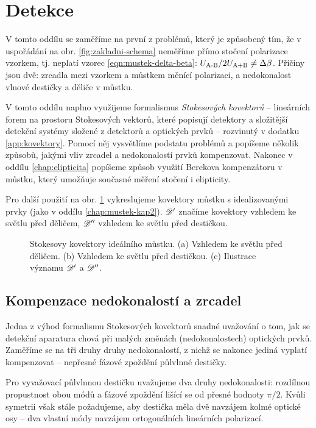 \section{Detekce}
\label{chap:detekce}

V tomto oddílu se zaměříme na první z problémů, který je způsobený tím, že v uspořádání na obr. \ref{fig:zakladni-schema} neměříme přímo stočení polarizace vzorkem, tj. neplatí vzorec \eqref{eqn:mustek-delta-beta}: $U_\textrm{A-B}/2U_\textrm{A+B}\neq\Delta\beta$.
Příčiny jsou dvě: zrcadla mezi vzorkem a můstkem měnící polarizaci, a nedokonalost vlnové destičky a děliče v můstku.

V tomto oddílu naplno využijeme formalismus \emph{Stokesových kovektorů} -- lineárních forem na prostoru Stokesových vektorů, které popisují detektory a složitější detekční systémy složené z detektorů a optických prvků -- rozvinutý v dodatku \ref{app:kovektory}.
Pomocí něj vysvětlíme podstatu problémů a popíšeme několik způsobů, jakými vliv zrcadel a nedokonalostí prvků kompenzovat.
Nakonec v oddílu \ref{chap:elipticita} popíšeme způsob využití Berekova kompenzátoru v můstku, který umožňuje současné měření stočení i elipticity.

Pro další použití na obr. \ref{fig:kovektor-ideal-mustek} vykreslujeme kovektory můstku s idealizovanými prvky (jako v oddílu \ref{chap:mustek-kap2}).
$\mathscr{D}'$ značíme kovektory vzhledem ke světlu před děličem, $\mathscr{D}''$ vzhledem ke světlu před destičkou.

\begin{figure}[htbp]
    \centering
    \caption{Stokesovy kovektory ideálního můstku. (a) Vzhledem ke světlu před děličem. (b) Vzhledem ke světlu před destičkou. (c) Ilustrace významu $\mathscr{D}'$ a $\mathscr{D}''$.}
    \label{fig:kovektor-ideal-mustek}
\end{figure}

\subsection{Kompenzace nedokonalostí a zrcadel}
Jedna z výhod formalismu Stokesových kovektorů snadné uvažování o tom, jak se detekční aparatura chová při malých změnách (nedokonalostech) optických prvků.
Zaměříme se na tři druhy druhy nedokonalostí, z nichž se nakonec jediná vyplatí kompenzovat -- nepřesné fázové zpoždění půlvlnné destičky.

Pro vyvažovací půlvlnnou destičku uvažujeme dva druhy nedokonalosti: rozdílnou propustnost obou módů a fázové zpoždění lišící se od přesné hodnoty $\pi/2$.
Kvůli symetrii však stále požadujeme, aby destička měla dvě navzájem kolmé optické osy -- dva vlastní módy navzájem ortogonálních lineárních polarizací.

